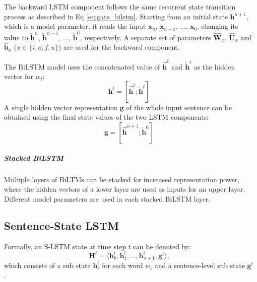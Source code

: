 \documentclass[11pt,a4paper]{article}
\begin{document}
The backward LSTM component follows the same recurrent state transition process as described in Eq \ref{eq:gate_bilstm}. 
Starting from an initial state $\boldsymbol{h}^{n+1}$, which is a model parameter, it reads the input $\boldsymbol{x}_n$, $\boldsymbol{x}_{n-1}$, $\dots$, $\boldsymbol{x}_0$, changing its value to $\boldsymbol{\overleftarrow{h}}^n$, $\boldsymbol{\overleftarrow{h}}^{n-1}$, $\dots$, $\boldsymbol{\overleftarrow{h}}^0$, respectively. 
A separate set of parameters $\boldsymbol{\hat{W}}_x$, $\boldsymbol{\hat{U}}_x$ and $\boldsymbol{\hat{b}}_x$ ($x \in \{i,o,f,u\}$) are used for the backward component.


The BiLSTM model uses the concatenated value of $\boldsymbol{\overrightarrow{h}}^t$ and $\boldsymbol{\overleftarrow{h}}^t$ as the hidden vector for $w_t$:
\[
\boldsymbol{h}^t = [\boldsymbol{\overrightarrow{h}}^t; \boldsymbol{\overleftarrow{h}}^t]
\]
A single hidden vector representation $\boldsymbol{g}$ of the whole input sentence can be obtained using the final state values of the two LSTM components:
\[
\boldsymbol{g} = [\boldsymbol{\overrightarrow{h}}^{n+1}; \boldsymbol{\overleftarrow{h}}^0]
\]



\subparagraph{Stacked BiLSTM}
Multiple layers of BiLTMs can be stacked for increased representation power, where the hidden vectors of a lower layer are used as inputs for an upper layer. 
Different model parameters are used in each stacked BiLSTM layer.


\subsection{Sentence-State LSTM}
\label{sec:m-lstm}


Formally, an S-LSTM state at time step $t$ can be denoted by:
\[
\boldsymbol{H}^t = \langle \boldsymbol{h}_0^t, \boldsymbol{h}_1^t, \dots, \boldsymbol{h}_{n+1}^t, \boldsymbol{g}^t \rangle \textrm{,}
\]
which consists of a sub state $\boldsymbol{h}_i^t$ for each word $w_i$ and a sentence-level sub state $\boldsymbol{g}^t$.
\end{document}
